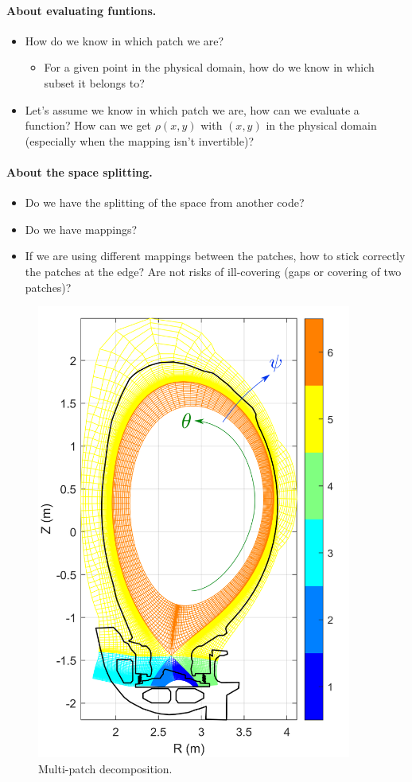 \documentclass[presentation.tex]{subfiles}
\begin{document}
\paragraph{About evaluating funtions.}
\begin{itemize}
	\item How do we know in which patch we are?
	\begin{itemize}
		\item For a given point in the physical domain, how do we know in which subset it belongs to?
	\end{itemize}
	\item Let's assume we know in which patch we are, how can we evaluate a function? How can we get $\rho(x,y)$ with $(x,y)$ in the physical domain (especially when the mapping isn't invertible)?
\end{itemize}



\paragraph{About the space splitting.}
\begin{itemize}
	\item Do we have the splitting of the space from another code?
	\item Do we have mappings?
	\item If we are using different mappings between the patches, how to stick correctly the patches at the edge? Are not risks of ill-covering (gaps or covering of two patches)? 
\end{itemize}


\begin{figure}[!h]
\centering
	\includegraphics[height=15cm]{images/JET_zones2_SOLEDGE.png}
\caption{Multi-patch decomposition.}
\end{figure}

\newpage
\end{document}

